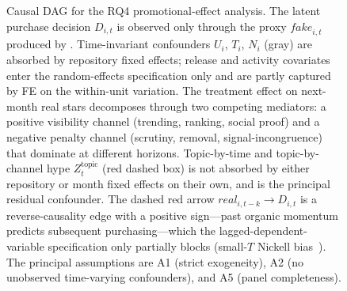 \begin{figure}[t]
{%
    }
    \caption{Causal DAG for the RQ4 promotional-effect analysis.
    The latent purchase decision $D_{i,t}$ is observed only through the proxy $\textit{fake}_{i,t}$ produced by \SystemName.
    Time-invariant confounders $U_i$, $T_i$, $N_i$ (gray) are absorbed by repository fixed effects; release and activity covariates enter the random-effects specification only and are partly captured by FE on the within-unit variation.
    The treatment effect on next-month real stars decomposes through two competing mediators: a positive visibility channel (trending, ranking, social proof) and a negative penalty channel (scrutiny, removal, signal-incongruence) that dominate at different horizons.
    Topic-by-time and topic-by-channel hype $Z_{t}^{\text{topic}}$ (red dashed box) is not absorbed by either repository or month fixed effects on their own, and is the principal residual confounder.
    The dashed red arrow $\textit{real}_{i, t-k} \to D_{i,t}$ is a reverse-causality edge with a positive sign---past organic momentum predicts subsequent purchasing---which the lagged-dependent-variable specification only partially blocks (small-$T$ Nickell bias~\cite{nickell1981biases}).
    The principal assumptions are A1 (strict exogeneity), A2 (no unobserved time-varying confounders), and A5 (panel completeness).}
    \label{fig:dag-fake-stars}
\end{figure}

